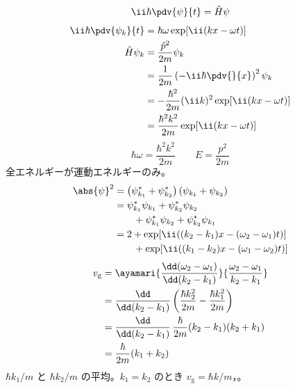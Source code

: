 \[ \ii\hbar\pdv{\psi}{t}=\hat{H}\psi \]
\begin{align*}
\ii\hbar\pdv{\psi_{k}}{t}&=\hbar\omega\exp[\ii(kx-\omega t)]\\
\hat{H}\psi_{k}&=\frac{\hat{p}^{2}}{2m}\psi_{k}\\
&=\frac{1}{2m}\left(-\ii\hbar\pdv{}{x}\right)^{2}\psi_{k}\\
&=-\frac{\hbar^{2}}{2m}(\ii k)^{2}\exp[\ii(kx-\omega t)]\\
&=\frac{\hbar^{2}k^{2}}{2m}\exp[\ii(kx-\omega t)]
\end{align*}
\[ \hbar\omega=\frac{\hbar^{2}k^{2}}{2m}\qquad E=\frac{p^{2}}{2m} \]
全エネルギーが運動エネルギーのみ。
\begin{align*}
\abs{\psi}^{2}&=\left(\psi_{k_{1}}^{*}+\psi_{k_{2}}^{*}\right)\left(\psi_{k_{1}}+\psi_{k_{2}}\right)\\
&=\psi_{k_{1}}^{*}\psi_{k_{1}}+\psi_{k_{2}}^{*}\psi_{k_{2}}\\
&\qquad+\psi_{k_{1}}^{*}\psi_{k_{2}}+\psi_{k_{2}}^{*}\psi_{k_{1}}\\
&=2+\exp[\ii((k_{2}-k_{1})x-(\omega_{2}-\omega_{1})t)]\\
&\qquad+\exp[\ii((k_{1}-k_{2})x-(\omega_{1}-\omega_{2})t)]
\end{align*}
\begin{align*}
v_{\mathrm{g}}&=\ayamari{\frac{\dd(\omega_{2}-\omega_{1})}{\dd(k_{2}-k_{1})}}{\frac{\omega_{2}-\omega_{1}}{k_{2}-k_{1}}}\\
&=\frac{\dd}{\dd(k_{2}-k_{1})}\left(\frac{\hbar k_{2}^{2}}{2m}-\frac{\hbar k_{1}^{2}}{2m}\right)\\
&=\frac{\dd}{\dd(k_{2}-k_{1})}\,\frac{\hbar}{2m}(k_{2}-k_{1})(k_{2}+k_{1})\\
&=\frac{\hbar}{2m}(k_{1}+k_{2})
\end{align*}
$\hbar k_{1}/m$ と $\hbar k_{2}/m$ の平均。$k_{1}=k_{2}$ のとき $v_{\mathrm{g}}=\hbar k/m$，。
